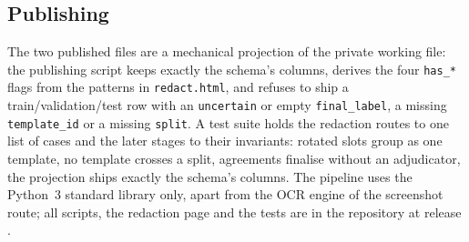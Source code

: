 \subsection*{Publishing}
The two published files are a mechanical projection of the private working file: the
publishing script keeps exactly the schema's columns, derives the four \texttt{has\_*} flags
from the patterns in \texttt{redact.html}, and refuses to ship a train/validation/test row with
an \texttt{uncertain} or empty \texttt{final\_label}, a missing \texttt{template\_id} or a
missing \texttt{split}. A test suite holds the redaction routes to one list of cases and the
later stages to their invariants: rotated slots group as one template, no template crosses a
split, agreements finalise without an adjudicator, the projection ships exactly the schema's
columns. The pipeline uses the Python~3 standard library only, apart from the OCR engine of the
screenshot route; all scripts, the redaction page and the tests are in the repository at
release .
